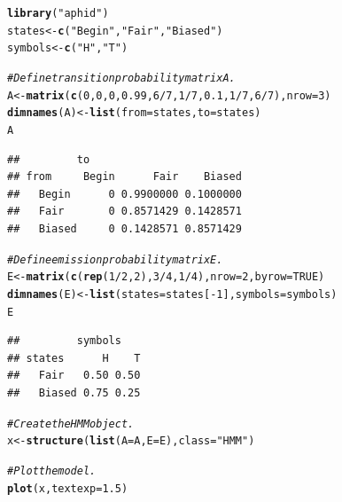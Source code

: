 \documentclass{article}\usepackage[]{graphicx}\usepackage[]{color}
\makeatletter
\newcommand{\hlnum}[1]{\textcolor[rgb]{0.686,0.059,0.569}{#1}}%
\newcommand{\hlstr}[1]{\textcolor[rgb]{0.192,0.494,0.8}{#1}}%
\newcommand{\hlcom}[1]{\textcolor[rgb]{0.678,0.584,0.686}{\textit{#1}}}%
\newcommand{\hlopt}[1]{\textcolor[rgb]{0,0,0}{#1}}%
\newcommand{\hlstd}[1]{\textcolor[rgb]{0.345,0.345,0.345}{#1}}%
\newcommand{\hlkwb}[1]{\textcolor[rgb]{0.69,0.353,0.396}{#1}}%
\newcommand{\hlkwc}[1]{\textcolor[rgb]{0.333,0.667,0.333}{#1}}%
\newcommand{\hlkwd}[1]{\textcolor[rgb]{0.737,0.353,0.396}{\textbf{#1}}}%
\newenvironment{kframe}{%
 \def\at@end@of@kframe{}%
 \ifinner\ifhmode%
  \def\at@end@of@kframe{\end{minipage}}%
  \begin{minipage}{\columnwidth}%
 \fi\fi%
 \def\FrameCommand##1{\hskip\@totalleftmargin \hskip-\fboxsep
 \colorbox{shadecolor}{##1}\hskip-\fboxsep
     \hskip-\linewidth \hskip-\@totalleftmargin \hskip\columnwidth}%
 \MakeFramed {\advance\hsize-\width
   \@totalleftmargin\z@ \linewidth\hsize
   \@setminipage}}%
 {\par\unskip\endMakeFramed%
 \at@end@of@kframe}
\newenvironment{knitrout}{}{} %
\makeatother
\begin{document}
\begin{center}
\begin{knitrout}
\color{fgcolor}\begin{kframe}
\begin{alltt}
\hlkwd{library}\hlstd{(}\hlstr{"aphid"}\hlstd{)}
\hlstd{states} \hlkwb{<-} \hlkwd{c}\hlstd{(}\hlstr{"Begin"}\hlstd{,} \hlstr{"Fair"}\hlstd{,} \hlstr{"Biased"}\hlstd{)}
\hlstd{symbols} \hlkwb{<-} \hlkwd{c}\hlstd{(}\hlstr{"H"}\hlstd{,} \hlstr{"T"}\hlstd{)}

\hlcom{# Define transition probability matrix A.}
\hlstd{A} \hlkwb{<-} \hlkwd{matrix}\hlstd{(}\hlkwd{c}\hlstd{(}\hlnum{0}\hlstd{,} \hlnum{0}\hlstd{,} \hlnum{0}\hlstd{,} \hlnum{0.99}\hlstd{,} \hlnum{6}\hlopt{/}\hlnum{7}\hlstd{,} \hlnum{1}\hlopt{/}\hlnum{7}\hlstd{,} \hlnum{0.1}\hlstd{,} \hlnum{1}\hlopt{/}\hlnum{7}\hlstd{,} \hlnum{6}\hlopt{/}\hlnum{7}\hlstd{),} \hlkwc{nrow} \hlstd{=} \hlnum{3}\hlstd{)}
\hlkwd{dimnames}\hlstd{(A)} \hlkwb{<-} \hlkwd{list}\hlstd{(}\hlkwc{from} \hlstd{= states,} \hlkwc{to} \hlstd{= states)}
\hlstd{A}
\end{alltt}
\begin{verbatim}
##         to
## from     Begin      Fair    Biased
##   Begin      0 0.9900000 0.1000000
##   Fair       0 0.8571429 0.1428571
##   Biased     0 0.1428571 0.8571429
\end{verbatim}
\begin{alltt}
\hlcom{# Define emission probability matrix E.}
\hlstd{E} \hlkwb{<-} \hlkwd{matrix}\hlstd{(}\hlkwd{c}\hlstd{(}\hlkwd{rep}\hlstd{(}\hlnum{1}\hlopt{/}\hlnum{2}\hlstd{,} \hlnum{2}\hlstd{),} \hlnum{3}\hlopt{/}\hlnum{4}\hlstd{,} \hlnum{1}\hlopt{/}\hlnum{4}\hlstd{),} \hlkwc{nrow} \hlstd{=} \hlnum{2}\hlstd{,} \hlkwc{byrow} \hlstd{=} \hlnum{TRUE}\hlstd{)}
\hlkwd{dimnames}\hlstd{(E)} \hlkwb{<-} \hlkwd{list}\hlstd{(}\hlkwc{states} \hlstd{= states[}\hlopt{-}\hlnum{1}\hlstd{],} \hlkwc{symbols} \hlstd{= symbols)}
\hlstd{E}
\end{alltt}
\begin{verbatim}
##         symbols
## states      H    T
##   Fair   0.50 0.50
##   Biased 0.75 0.25
\end{verbatim}
\begin{alltt}
\hlcom{# Create the HMM object.}
\hlstd{x} \hlkwb{<-} \hlkwd{structure}\hlstd{(}\hlkwd{list}\hlstd{(}\hlkwc{A} \hlstd{= A,} \hlkwc{E} \hlstd{= E),} \hlkwc{class} \hlstd{=} \hlstr{"HMM"}\hlstd{)}

\hlcom{# Plot the model.}
\hlkwd{plot}\hlstd{(x,} \hlkwc{textexp} \hlstd{=} \hlnum{1.5}\hlstd{)}


\end{alltt}
\end{kframe}
\end{knitrout}
\end{center}
\end{document}
